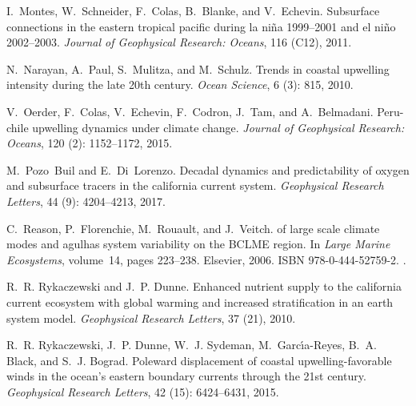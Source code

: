 \documentclass[hvmath, online,bgd]{copernicus_discussions}
\begin{document}
\begin{thebibliography}{84}
	I.~Montes, W.~Schneider, F.~Colas, B.~Blanke, and V.~Echevin.
	\newblock Subsurface connections in the eastern tropical pacific during la
	ni{\~n}a 1999--2001 and el ni{\~n}o 2002--2003.
	\newblock \emph{Journal of Geophysical Research: Oceans}, 116 (C12),
	2011.
	
	N.~Narayan, A.~Paul, S.~Mulitza, and M.~Schulz.
	\newblock Trends in coastal upwelling intensity during the late 20th century.
	\newblock \emph{Ocean Science}, 6 (3): 815, 2010.
	
	V.~Oerder, F.~Colas, V.~Echevin, F.~Codron, J.~Tam, and A.~Belmadani.
	\newblock Peru-chile upwelling dynamics under climate change.
	\newblock \emph{Journal of Geophysical Research: Oceans}, 120
	(2): 1152--1172, 2015.
	
	M.~Pozo~Buil and E.~Di~Lorenzo.
	\newblock Decadal dynamics and predictability of oxygen and subsurface tracers
	in the california current system.
	\newblock \emph{Geophysical Research Letters}, 44 (9):
	4204--4213, 2017.
	
	C.~Reason, P.~Florenchie, M.~Rouault, and J.~Veitch.
	 of large scale climate modes and agulhas system
	variability on the {BCLME} region.
	\newblock In \emph{Large {Marine} {Ecosystems}}, volume~14, pages 223--238.
	Elsevier, 2006.
	\newblock ISBN 978-0-444-52759-2.
	\newblock {}.
	
	R.~R. Rykaczewski and J.~P. Dunne.
	\newblock Enhanced nutrient supply to the california current ecosystem with
	global warming and increased stratification in an earth system model.
	\newblock \emph{Geophysical Research Letters}, 37 (21), 2010.
	
	R.~R. Rykaczewski, J.~P. Dunne, W.~J. Sydeman, M.~Garc{\'\i}a-Reyes, B.~A.
	Black, and S.~J. Bograd.
	\newblock Poleward displacement of coastal upwelling-favorable winds in the
	ocean's eastern boundary currents through the 21st century.
	\newblock \emph{Geophysical Research Letters}, 42 (15):
	6424--6431, 2015.
	

\end{thebibliography}
\end{document}
